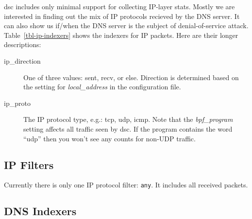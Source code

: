 \documentclass{report}
\def\dsc{{\sc dsc}}
\begin{document}
{\dsc} includes only minimal support for collecting IP-layer
stats.  Mostly we are interested in finding out the mix of
IP protocols recieved by the DNS server.  It can also show us
if/when the DNS server is the subject of denial-of-service
attack.
Table~\ref{tbl-ip-indexers} shows the indexers for IP packets.
Here are their longer descriptions:

\begin{description}
\item[ip\_direction]
	One of three values: sent, recv, or else.  Direction is determined
	based on the setting for {\em local\_address\/} in the configuration file.
\item[ip\_proto]
	The IP protocol type, e.g.: tcp, udp, icmp.
	Note that the {\em bpf\_program\/} setting affects all traffic
	seen by {\dsc}.  If the program contains the word ``udp''
	then you won't see any counts for non-UDP traffic.
\end{description}

\subsection{IP Filters}

Currently there is only one IP protocol filter: {\tt any\/}.
It includes all received packets.


\subsection{DNS Indexers}
\end{document}
